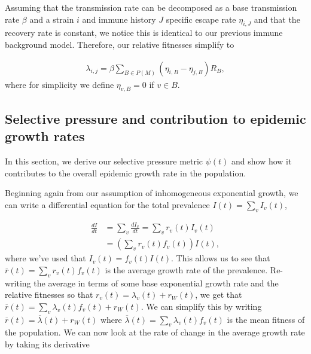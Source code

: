 \documentclass[11pt,oneside,letterpaper]{article}
\newcommand{\wt}{W}
\newcommand{\varEscape}{\eta}
\begin{document}
Assuming that the transmission rate can be decomposed as a base transmission rate $\beta$ and a strain $i$ and immune history $J$ specific escape rate $\varEscape_{i, J}$ and that the recovery rate is constant, we notice this is identical to our previous immune background model.
Therefore, our relative fitnesses simplify to

\begin{align}
    \lambda_{i, j} = \beta \sum_{B \in P(M)} (\varEscape_{i, B} - \varEscape_{j, B}) R_{B},
\end{align}
where for simplicity we define $\varEscape_{v, B} = 0$ if $v \in B$.

\subsection{Selective pressure and contribution to epidemic growth rates}\label{ssec:deriving_selective_pressure}

In this section, we derive our selective pressure metric $\psi(t)$ and show how it contributes to the overall epidemic growth rate in the population.

Beginning again from our assumption of inhomogeneous exponential growth, we can write a differential equation for the total prevalence $I(t)= \sum_{v} I_{v}(t)$,

\begin{align}
    \frac{d I}{d t} &= \sum_{v} \frac{d I_{v}}{d t} =  \sum_{v} r_{v}(t) I_{v}(t)\\
                    &= \left( \sum_{v} r_{v}(t) f_{v}(t) \right) I(t),
\end{align}
where we've used that $I_{v}(t) = f_{v}(t) I(t)$.
This allows us to see that $\overline{r}(t) = \sum_{v} r_{v}(t) f_{v}(t)$ is the average growth rate of the prevalence.
Re-writing the average in terms of some base exponential growth rate and the relative fitnesses so that $r_{v}(t) = \lambda_{v}(t) + r_\wt(t)$, we get that $\overline{r}(t) = \sum_{v} \lambda_{v}(t)f_{v}(t) + r_\wt(t)$.
We can simplify this by writing $\overline{r}(t) = \overline{\lambda}(t) + r_\wt(t)$ where $\overline{\lambda}(t) = \sum_{v} \lambda_{v}(t)f_{v}(t)$ is the mean fitness of the population.
We can now look at the rate of change in the average growth rate by taking its derivative
\end{document}
